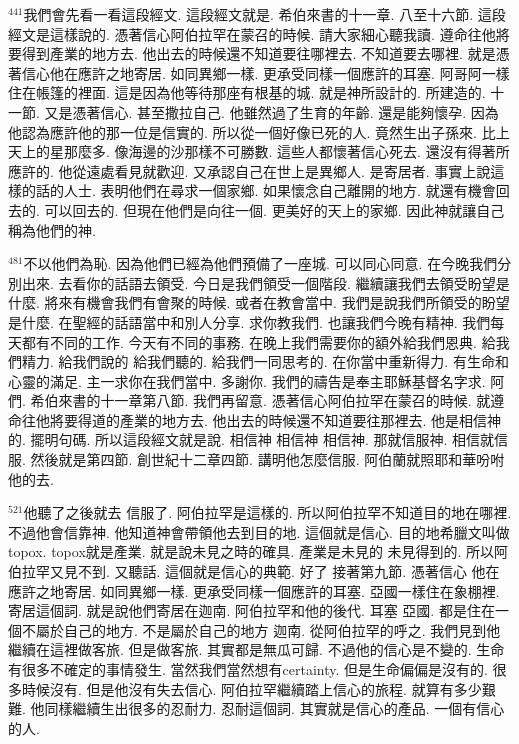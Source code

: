 \documentclass{book}
\begin{document}
$^{441}$我們會先看一看這段經文.
這段經文就是.
希伯來書的十一章.
八至十六節.
這段經文是這樣說的.
憑著信心阿伯拉罕在蒙召的時候.
請大家細心聽我讀.
遵命往他將要得到產業的地方去.
他出去的時候還不知道要往哪裡去.
不知道要去哪裡.
就是憑著信心他在應許之地寄居.
如同異鄉一樣.
更承受同樣一個應許的耳塞.
阿哥阿一樣住在帳篷的裡面.
這是因為他等待那座有根基的城.
就是神所設計的.
所建造的.
十一節.
又是憑著信心.
甚至撒拉自己.
他雖然過了生育的年齡.
還是能夠懷孕.
因為他認為應許他的那一位是信實的.
所以從一個好像已死的人.
竟然生出子孫來.
比上天上的星那麼多.
像海邊的沙那樣不可勝數.
這些人都懷著信心死去.
還沒有得著所應許的.
他從遠處看見就歡迎.
又承認自己在世上是異鄉人.
是寄居者.
事實上說這樣的話的人士.
表明他們在尋求一個家鄉.
如果懷念自己離開的地方.
就還有機會回去的.
可以回去的.
但現在他們是向往一個.
更美好的天上的家鄉.
因此神就讓自己稱為他們的神.

$^{481}$不以他們為恥.
因為他們已經為他們預備了一座城.
可以同心同意.
在今晚我們分別出來.
去看你的話語去領受.
今日是我們領受一個階段.
繼續讓我們去領受盼望是什麼.
將來有機會我們有會聚的時候.
或者在教會當中.
我們是說我們所領受的盼望是什麼.
在聖經的話語當中和別人分享.
求你教我們.
也讓我們今晚有精神.
我們每天都有不同的工作.
今天有不同的事務.
在晚上我們需要你的額外給我們恩典.
給我們精力.
給我們說的 給我們聽的.
給我們一同思考的.
在你當中重新得力.
有生命和心靈的滿足.
主一求你在我們當中.
多謝你.
我們的禱告是奉主耶穌基督名字求.
阿們.
希伯來書的十一章第八節.
我們再留意.
憑著信心阿伯拉罕在蒙召的時候.
就遵命往他將要得道的產業的地方去.
他出去的時候還不知道要往那裡去.
他是相信神的.
擺明句碼.
所以這段經文就是說.
相信神 相信神 相信神.
那就信服神.
相信就信服.
然後就是第四節.
創世紀十二章四節.
講明他怎麼信服.
阿伯蘭就照耶和華吩咐他的去.

$^{521}$他聽了之後就去 信服了.
阿伯拉罕是這樣的.
所以阿伯拉罕不知道目的地在哪裡.
不過他會信靠神.
他知道神會帶領他去到目的地.
這個就是信心.
目的地希臘文叫做topox.
topox就是產業.
就是說未見之時的確具.
產業是未見的 未見得到的.
所以阿伯拉罕又見不到.
又聽話.
這個就是信心的典範.
好了 接著第九節.
憑著信心 他在應許之地寄居.
如同異鄉一樣.
更承受同樣一個應許的耳塞.
亞國一樣住在象棚裡.
寄居這個詞.
就是說他們寄居在迦南.
阿伯拉罕和他的後代.
耳塞 亞國.
都是住在一個不屬於自己的地方.
不是屬於自己的地方 迦南.
從阿伯拉罕的呼之.
我們見到他繼續在這裡做客旅.
但是做客旅.
其實都是無瓜可歸.
不過他的信心是不變的.
生命有很多不確定的事情發生.
當然我們當然想有certainty.
但是生命偏偏是沒有的.
很多時候沒有.
但是他沒有失去信心.
阿伯拉罕繼續踏上信心的旅程.
就算有多少艱難.
他同樣繼續生出很多的忍耐力.
忍耐這個詞.
其實就是信心的產品.
一個有信心的人.
\end{document}
